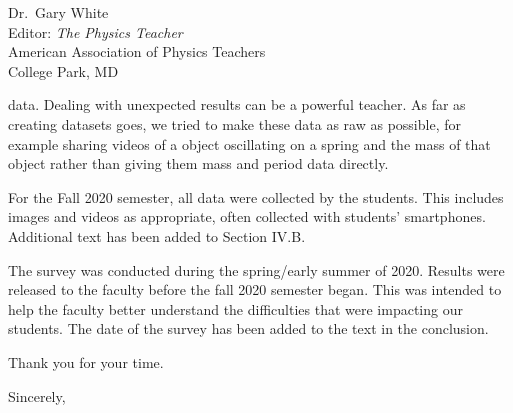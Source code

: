 \documentclass{letter}
\makeatletter
\renewcommand{\closing}[1]{\par\nobreak\vspace{\parskip}%
  \stopbreaks
  \noindent
  \ifx\@empty\fromaddress\else
  \hspace*{\longindentation}\fi
  \parbox{\indentedwidth}{\raggedright
       \ignorespaces #1\\[2\medskipamount]%
       \ifx\@empty\fromsig
           \fromname
       \else \fromsig \fi\strut}%
   \par}
\makeatother
\begin{document}
\begin{letter}{Dr.\ Gary White \\ Editor: \textit{The Physics Teacher} \\ American Association
    of Physics Teachers \\ College Park, MD}
\begin{description}
    data. Dealing with unexpected results can be a powerful teacher. As far as creating
    datasets goes, we tried to make these data as raw as possible, for example sharing videos
    of a object oscillating on a spring and the mass of that object rather than giving them
    mass and period data directly. 
    \item[Details about Fall 2020] For the Fall 2020 semester, all data were collected by the
    students.  This includes images and videos as appropriate, often collected with students'
    smartphones. Additional text has been added to Section \textrm{IV}.B.
    \item[Details about the survey] The survey was conducted during the spring/early summer of
    2020.  Results were released to the faculty before the fall 2020 semester began.  This was
    intended to help the faculty better understand the difficulties that were impacting our
    students. The date of the survey has been added to the text in the conclusion.
  \end{description}

  Thank you for your time.
  
  \closing{Sincerely,}
    
\end{letter}
\end{document}
